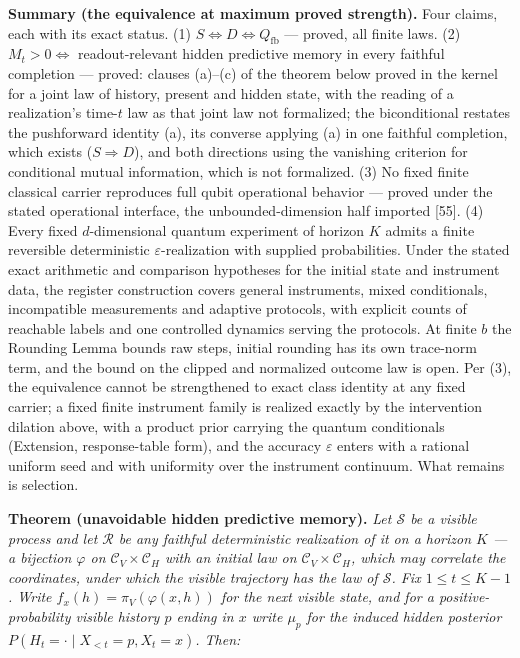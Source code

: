 \documentclass[
]{article}
\begin{document}
\textbf{Summary (the equivalence at maximum proved strength).} Four
claims, each with its exact status. (1)
\(S \iff D \iff Q_{\mathrm{fb}}\) --- proved, all finite laws. (2)
\(M_t > 0 \iff\) readout-relevant hidden predictive memory in every
faithful completion --- proved: clauses (a)--(c) of the theorem below
proved in the kernel for a joint law of history, present and hidden
state, with the reading of a realization's time-\(t\) law as that joint
law not formalized; the biconditional restates the pushforward identity
(a), its converse applying (a) in one faithful completion, which exists
(\(S \Rightarrow D\)), and both directions using the vanishing criterion
for conditional mutual information, which is not formalized. (3) No
fixed finite classical carrier reproduces full qubit operational
behavior --- proved under the stated operational interface, the
unbounded-dimension half imported {[}55{]}. (4) Every fixed
\(d\)-dimensional quantum experiment of horizon \(K\) admits a finite
reversible deterministic \(\varepsilon\)-realization with supplied
probabilities. Under the stated exact arithmetic and comparison
hypotheses for the initial state and instrument data, the register
construction covers general instruments, mixed conditionals,
incompatible measurements and adaptive protocols, with explicit counts
of reachable labels and one controlled dynamics serving the protocols.
At finite \(b\) the Rounding Lemma bounds raw steps, initial rounding
has its own trace-norm term, and the bound on the clipped and normalized
outcome law is open. Per (3), the equivalence cannot be strengthened to
exact class identity at any fixed carrier; a fixed finite instrument
family is realized exactly by the intervention dilation above, with a
product prior carrying the quantum conditionals (Extension,
response-table form), and the accuracy \(\varepsilon\) enters with a
rational uniform seed and with uniformity over the instrument continuum.
What remains is selection.

\textbf{Theorem (unavoidable hidden predictive memory).} \emph{Let
\(\mathcal{S}\) be a visible process and let \(\mathcal{R}\) be any
faithful deterministic realization of it on a horizon \(K\) --- a
bijection \(\varphi\) on \(\mathcal{C}_V \times \mathcal{C}_H\) with an
initial law on \(\mathcal{C}_V \times \mathcal{C}_H\), which may
correlate the coordinates, under which the visible trajectory has the
law of \(\mathcal{S}\). Fix \(1 \leq t \leq K-1\). Write
\(f_x(h) = \pi_V(\varphi(x,h))\) for the next visible state, and for a
positive-probability visible history \(p\) ending in \(x\) write
\(\mu_p\) for the induced hidden posterior
\(P(H_t = \cdot \mid X_{<t} = p, X_t = x)\). Then:}
\end{document}
